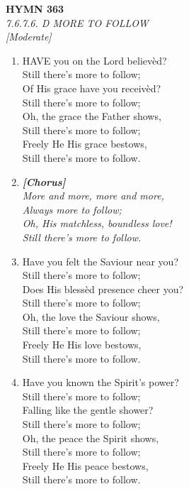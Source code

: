 \documentclass[11pt,a4paper]{article}
\begin{document}
\newpage
\begin{center}
    {\Large \textbf{HYMN 363}}
    \\
    \textit{7.6.7.6. D MORE TO FOLLOW}
    \\
    \textit{\small [Moderate]}
\end{center}
\vspace{1em}

\begin{enumerate}
    \item HAVE you on the Lord believ\`ed? \\
        Still there's more to follow; \\
        Of His grace have you receiv\`ed? \\
        Still there's more to follow; \\
        Oh, the grace the Father shows, \\
        Still there's more to follow; \\
        Freely He His grace bestows, \\
        Still there's more to follow.

    \item[] \vspace{0.4em}
    \textbf{\textit{[Chorus]}} \\
    \textit{More and more, more and more,} \\
    \textit{Always more to follow;} \\
    \textit{Oh, His matchless, boundless love!} \\
    \textit{Still there's more to follow.}
    \vspace{0.4em}

    \item Have you felt the Saviour near you? \\
        Still there's more to follow; \\
        Does His bless\`ed presence cheer you? \\
        Still there's more to follow; \\
        Oh, the love the Saviour shows, \\
        Still there's more to follow; \\
        Freely He His love bestows, \\
        Still there's more to follow.

    \item Have you known the Spirit's power? \\
        Still there's more to follow; \\
        Falling like the gentle shower? \\
        Still there's more to follow; \\
        Oh, the peace the Spirit shows, \\
        Still there's more to follow; \\
        Freely He His peace bestows, \\
        Still there's more to follow.

\end{enumerate}
\end{document}
